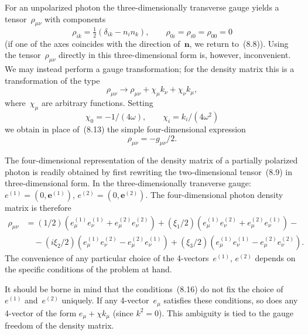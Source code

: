 For an unpolarized photon the three-dimensionally transverse gauge yields a tensor~$\rho_{\mu\nu}$ with components
\begin{equation}
\rho_{ik} = \tfrac{1}{2}(\delta_{ik} - n_in_k), \qquad \rho_{0i} = \rho_{i0} = \rho_{00} = 0
\tag{8.13}
\end{equation}
(if one of the axes coincides with the direction of~$\mathbf{n}$, we return to~(8.8)). Using the tensor~$\rho_{\mu\nu}$ directly in this three-dimensional form is, however, inconvenient. We may instead perform a gauge transformation; for the density matrix this is a transformation of the type
\begin{equation}
\rho_{\mu\nu} \to \rho_{\mu\nu} + \chi_\mu k_\nu + \chi_\nu k_\mu,
\tag{8.14}
\end{equation}
where~$\chi_\mu$ are arbitrary functions. Setting
\[
\chi_0 = -1/(4\omega), \qquad \chi_i = k_i/(4\omega^2)
\]
we obtain in place of~(8.13) the simple four-dimensional expression
\begin{equation}
\rho_{\mu\nu} = -g_{\mu\nu}/2.
\tag{8.15}
\end{equation}

The four-dimensional representation of the density matrix of a partially polarized photon is readily obtained by first rewriting the two-dimensional tensor~(8.9) in three-dimensional form.
In the three-dimensionally transverse gauge: $e^{(1)} = (0, \mathbf{e}^{(1)})$, $e^{(2)} = (0, \mathbf{e}^{(2)})$. The four-dimensional photon density matrix is therefore
\begin{equation}
\begin{split}
\rho_{\mu\nu} &= (1/2)(e_\mu^{(1)}e_\nu^{(1)} + e_\mu^{(2)}e_\nu^{(2)}) + (\xi_1/2)(e_\mu^{(1)}e_\nu^{(2)} + e_\mu^{(2)}e_\nu^{(1)}) -\\
&\quad - (i\xi_2/2)(e_\mu^{(1)}e_\nu^{(2)} - e_\mu^{(2)}e_\nu^{(1)}) + (\xi_3/2)(e_\mu^{(1)}e_\nu^{(1)} - e_\mu^{(2)}e_\nu^{(2)}).
\end{split}
\tag{8.17}
\end{equation}
The convenience of any particular choice of the 4-vectors~$e^{(1)}$, $e^{(2)}$ depends on the specific conditions of the problem at hand.

It should be borne in mind that the conditions~(8.16) do not fix the choice of~$e^{(1)}$ and~$e^{(2)}$ uniquely. If any 4-vector~$e_\mu$ satisfies these conditions, so does any 4-vector of the form $e_\mu + \chi k_\mu$ (since $k^2 = 0$). This ambiguity is tied to the gauge freedom of the density matrix.

